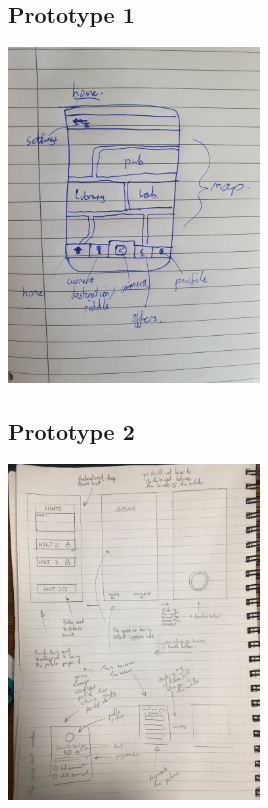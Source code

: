 \documentclass[10pt,twocolumn]{article} %
\begin{document}
\subsection*{Prototype 1}
\includegraphics[width=0.5\textwidth]{./figures/bens_initial_proto/1.jpg}

\newpage
\subsection*{Prototype 2}
\includegraphics[width=0.5\textwidth]{./figures/dans_initial_proto/1.jpg}
\end{document}
